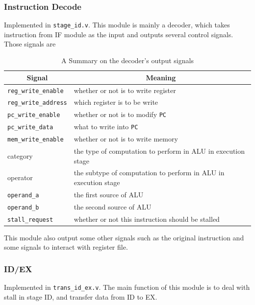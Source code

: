 \documentclass[paper=a4, fontsize=11pt]{scrartcl} %
\numberwithin{equation}{section} %
\numberwithin{figure}{section} %
\numberwithin{table}{section} %
\begin{document}
\begin{spacing}{1.5}
    	\subsubsection{Instruction Decode} Implemented in \verb|stage_id.v|. This module is mainly a decoder, which takes instruction from IF module as the input and outputs several control signals. Those signals are
    		\begin{table}[!htb]
				\centering
				\begin{tabular}{|l|l|}
				\hline
				\multicolumn{1}{|c|}{Signal} & \multicolumn{1}{c|}{Meaning}                                    \\ \hline
		    \verb|reg_write_enable|                  & whether or not is to write register                             \\ \hline
			\verb|reg_write_address|                       & which register is to be write                                   \\ \hline
			\verb|pc_write_enable|				&whether or not is to modify \verb|PC|								\\ \hline
			\verb|pc_write_data|				 &what to write into \verb|PC| 												\\ \hline
			\verb|mem_write_enable|                     & whether or not is to write memory                               \\ \hline
			category                      & the type of computation to perform in ALU in execution stage    \\ \hline
			operator                        & the subtype of computation to perform in ALU in execution stage \\ \hline
			\verb|operand_a|                      & the first source of ALU 				                  \\ \hline
			\verb|operand_b|                		& the second source of ALU				                  \\ \hline
			\verb|stall_request|                      & whether or not this instruction should be stalled           \\ \hline
				\end{tabular}
				\caption{A Summary on the decoder's output signals}
			\end{table}
			
			This module also output some other signals such as the original instruction and some signals to interact with register file.
		\subsubsection{ID/EX} Implemented in \verb|trans_id_ex.v|. The main function of this module is to deal with stall in stage ID, and transfer data from ID to EX.

\end{spacing}
\end{document}
